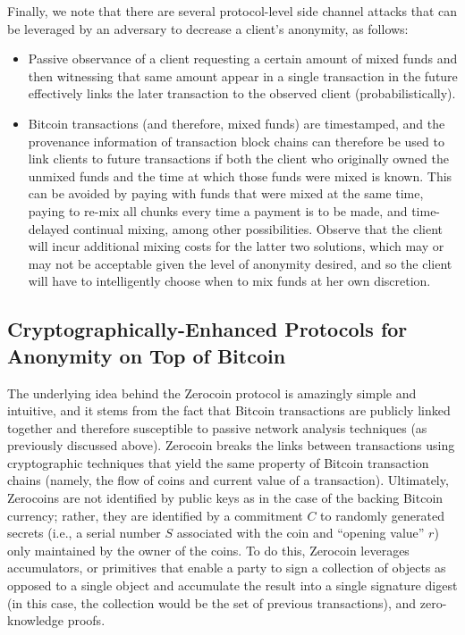 Finally, we note that there are several protocol-level side channel attacks that can be leveraged by an adversary to decrease a client's anonymity, as follows:
\begin{itemize}
	\item Passive observance of a client requesting a certain amount of mixed funds and then witnessing that same amount appear in a single transaction in the future effectively links the later transaction to the observed client (probabilistically).
	\item Bitcoin transactions (and therefore, mixed funds) are timestamped, and the provenance information of transaction block chains can therefore be used to link clients to future transactions if both the client who originally owned the unmixed funds and the time at which those funds were mixed is known. This can be avoided by paying with funds that were mixed at the same time, paying to re-mix all chunks every time a payment is to be made, and time-delayed continual mixing, among other possibilities. Observe that the client will incur additional mixing costs for the latter two solutions, which may or may not be acceptable given the level of anonymity desired, and so the client will have to intelligently choose when to mix funds at her own discretion.
\end{itemize}

\subsection{Cryptographically-Enhanced Protocols for Anonymity on Top of Bitcoin}

The underlying idea behind the Zerocoin protocol is amazingly simple and intuitive, and it stems from the fact that Bitcoin transactions are publicly linked together and therefore susceptible to passive network analysis techniques (as previously discussed above). Zerocoin breaks the links between transactions using cryptographic techniques that yield the same property of Bitcoin transaction chains (namely, the flow of coins and current value of a transaction). Ultimately, Zerocoins are not identified by public keys as in the case of the backing Bitcoin currency; rather, they are identified by a commitment $C$ to randomly generated secrets (i.e., a serial number $S$ associated with the coin and ``opening value'' $r$) only maintained by the owner of the coins. To do this, Zerocoin leverages accumulators, or primitives that enable a party to sign a collection of objects as opposed to a single object and accumulate the result into a single signature digest (in this case, the collection would be the set of previous transactions), and zero-knowledge proofs. 

